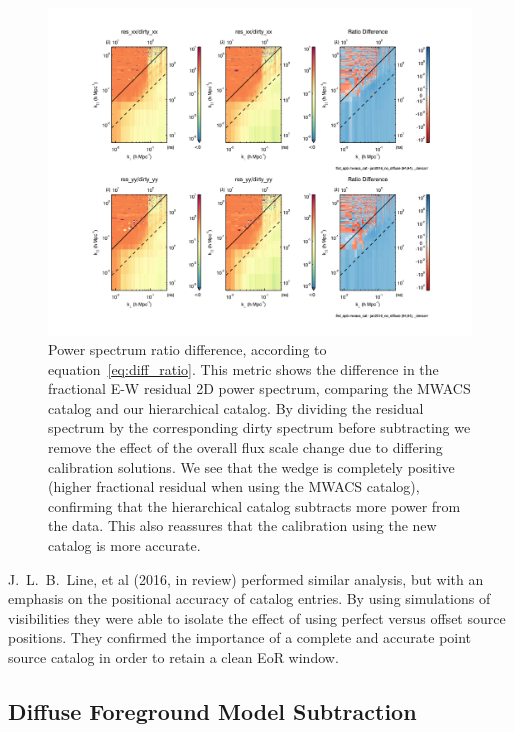 \documentclass[iop]{emulateapj}
\begin{document}
\begin{figure}
\includegraphics[width=\columnwidth]{mwacs_ratio.pdf}
\caption{Power spectrum ratio difference, according to equation~\ref{eq:diff_ratio}. This 
metric shows the difference in the fractional E-W residual 2D power spectrum, comparing 
the MWACS catalog and our hierarchical catalog. By dividing the residual spectrum by the 
corresponding dirty spectrum before subtracting we remove the effect of the overall flux 
scale change due to differing calibration solutions. We see that the wedge is completely 
positive (higher fractional residual when using the MWACS catalog), confirming that the 
hierarchical catalog subtracts more power from the data. This also reassures that the 
calibration using the new catalog is more accurate. 
\label{fig:mwacs_ratio}
}
\end{figure}

J.~L.~B.~Line, et al (2016, in review) performed similar analysis, but with an emphasis on the
positional accuracy of catalog entries. By using simulations of visibilities they were able to 
isolate the effect of using perfect versus offset source positions. They confirmed the
importance of a complete and accurate point source catalog in order to retain a clean EoR
window.

\subsection{Diffuse Foreground Model Subtraction}
\end{document}
